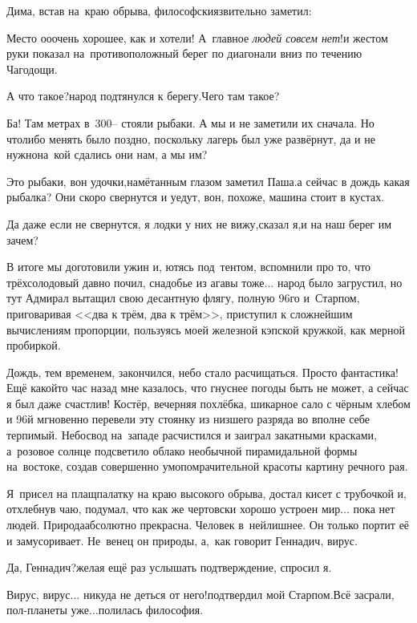 Дима, встав на~краю обрыва, философски\sdash язвительно заметил: 

\diagdash Место о\sdash о\sdash очень хорошее, как и хотели! А~главное \textit{людей совсем нет}!\mdash и жестом руки показал на~противоположный берег по диагонали вниз по течению Чагодощи. 

\diagdash А что такое?\mdash народ подтянулся к берегу.\mdash Чего там такое?

Ба! Там метрах в~300\thinspace\nobreakdash-- стояли рыбаки. А мы и не заметили их сначала. Но что\sdash либо менять было поздно, поскольку лагерь был уже развёрнут, да и не нужно\mdash на~кой сдались они нам, а мы им?

\diagdash Это рыбаки, вон удочки,\mdash намётанным глазом заметил Паша.\mdash а сейчас в дождь какая рыбалка? Они скоро свернутся и уедут, вон, похоже, машина стоит в кустах.

\diagdash Да даже если не свернутся, я лодки у них не вижу,\mdash сказал я,\mdash и на наш берег им зачем?

В итоге мы доготовили ужин и, ютясь под~тентом, вспомнили про то, что трёхсолодовый давно почил, снадобье из агавы тоже$\ldots$ народ было загрустил, но тут Адмирал вытащил свою десантную флягу, полную 96\sdash го и~Старпом, приговаривая <<два к трём, два к трём>>, приступил к сложнейшим вычислениям пропорции, пользуясь моей железной кэпской кружкой, как мерной пробиркой. 

Дождь, тем временем, закончился, небо стало расчищаться. Просто фантастика! Ещё какой\sdash то час назад мне казалось, что гнуснее погоды быть не может, а сейчас я был даже счастлив! Костёр, вечерняя похлёбка, шикарное сало с чёрным хлебом и 96\sdash й мгновенно перевели эту стоянку из низшего разряда во вполне себе терпимый. Небосвод на~западе расчистился и заиграл закатными красками, а~розовое солнце подсветило облако необычной пирамидальной формы на~востоке, создав совершенно умопомрачительной красоты картину речного рая. 

Я~присел на плащ\sdash палатку на краю высокого обрыва, достал кисет с трубочкой и, отхлебнув чаю, подумал, что как же чертовски хорошо устроен мир$\ldots$ пока нет людей. Природа\mdash абсолютно прекрасна. Человек в~ней\mdash лишнее. Он только портит её и замусоривает. Не~венец он природы, а,~как говорит Геннадич, вирус.

\diagdash Да, Геннадич?\mdash желая ещё раз услышать подтверждение, спросил я.

\diagdash Вирус, вирус$\ldots$ никуда не деться от него!\mdash подтвердил мой Старпом.\mdash Всё засрали, пол-планеты уже$\ldots$\mdash полилась философия.

